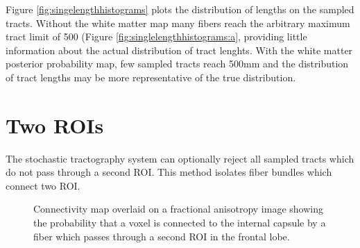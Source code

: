 Figure \ref{fig:singelengthhistograms} plots the distribution of lengths on the sampled tracts.  Without the white matter map many fibers reach the arbitrary maximum tract limit of 500 (Figure \ref{fig:singlelengthhistograms:a}, providing little information about the actual distribution of tract lenghts.  With the white matter posterior probability map, few sampled tracts reach 500mm and the distribution of tract lengths may be more representative of the true distribution.


\section{Two ROIs}

The stochastic tractography system can optionally reject all sampled tracts which do not pass through a second ROI.  This method isolates fiber bundles which connect two ROI.  
\begin{figure} \label{fig:twocmaps}
	\caption{Connectivity map overlaid on a fractional anisotropy image showing the probability that a voxel is connected to the internal capsule by a fiber which passes through a second ROI in the frontal lobe.}
\end{figure}

